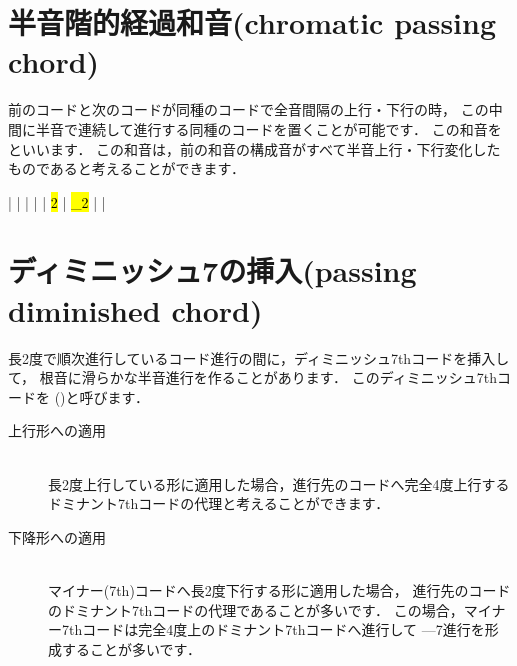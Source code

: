 \documentclass[dvipdfmx,uplatex,b5paper,openany,jbase=12Q,nomag*,textwidth-limit=44%
               ]{gachimuchi}
\begin{document}
\section{半音階的経過和音(chromatic passing chord)}
前のコードと次のコードが同種のコードで全音間隔の上行・下行の時，
この中間に半音で連続して進行する同種のコードを置くことが可能です．
この和音をといいます．
この和音は，前の和音の構成音がすべて半音上行・下行変化したものであると考えることができます．

\begin{Music}
  \generalmeter{\meterC}%
  \Startpiece
  \NOTes%
  |%
  \en%
  \NOTes%
  |%
  \en\bar%
  \NOTEs%
  |%
  \en\doublebar%
  \NOTes%
  |%
  \hl{2}%
  \en%
  \NOTes%
  |%
  \hl{_2}%
  \en\bar%
  \NOTEs%
  |%
  \en\setdoublebar%
  \endpiece%
\end{Music}

\section{ディミニッシュ7の挿入(passing diminished chord)}
長2度で順次進行しているコード進行の間に，ディミニッシュ7thコードを挿入して，
根音に滑らかな半音進行を作ることがあります．
このディミニッシュ7thコードを
\jghost()と呼びます．
\begin{description}
  \item[上行形への適用] ~\\
  長2度上行している形に適用した場合，進行先のコードへ完全4度上行する
  ドミナント7thコードの代理と考えることができます．
  \item[下降形への適用] ~\\
  マイナー(7th)コードへ長2度下行する形に適用した場合，
  進行先のコードのドミナント7thコードの代理であることが多いです．
  この場合，マイナー7thコードは完全4度上のドミナント7thコードへ進行して
  \Gnii\Min{}---\Gnv\subsc7進行を形成することが多いです．
\end{description}
\end{document}
